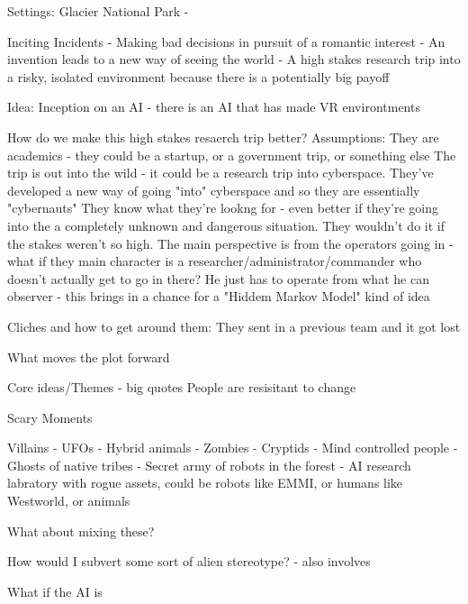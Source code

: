 Settings:
Glacier National Park
-

Inciting Incidents
- Making bad decisions in pursuit of a romantic interest
- An invention leads to a new way of seeing the world
- A high stakes research trip into a risky, isolated environment because there is a potentially big payoff




Idea:
Inception on an AI - there is an AI that has made VR environtments


How do we make this high stakes resaerch trip better?
Assumptions:
They are academics - they could be a startup, or a government trip, or something else
The trip is out into the wild - it could be a research trip into cyberspace. They've developed a new way of going "into" cyberspace and so they are essentially "cybernauts"
They know what they're lookng for - even better if they're going into the a completely unknown and dangerous situation. They wouldn't do it if the stakes weren't so high.
The main perspective is from the operators going in - what if they main character is a researcher/administrator/commander who doesn't actually get to go in there? He just has to operate from what he can observer
- this brings in a chance for a "Hiddem Markov Model" kind of idea


Cliches and how to get around them:
They sent in a previous team and it got lost








What moves the plot forward



Core ideas/Themes - big quotes
People are resisitant to change




Scary Moments




Villains
- UFOs
- Hybrid animals
- Zombies
- Cryptids
- Mind controlled people
- Ghosts of native tribes
- Secret army of robots in the forest
- AI research labratory with rogue assets, could be robots like EMMI, or humans like Westworld, or animals


What about mixing these?

How would I subvert some sort of alien stereotype?
- also involves

What if the AI is
